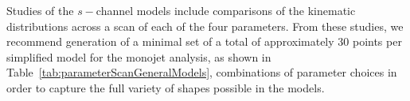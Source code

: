 \documentclass[a4,debug,notitlepage,nobib]{tufte-handout}
\begin{document}

Studies of the $s-$channel models include comparisons of the kinematic
distributions across a scan of each of the four parameters. From these
studies, we recommend generation of a minimal set of a total of approximately 30 points 
per simplified model for the monojet analysis, as shown in Table~\ref{tab:parameterScanGeneralModels},
combinations of parameter choices in order to capture the full variety
of shapes possible in the models.
\end{document}
